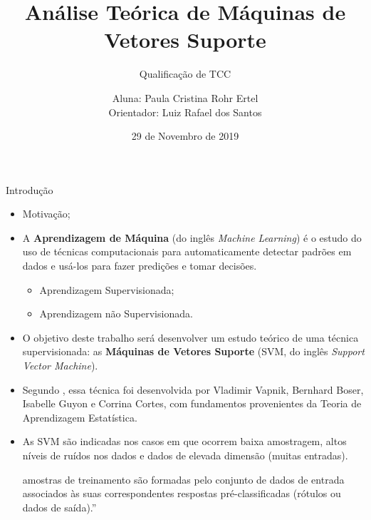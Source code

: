 \documentclass{beamer}
\title[Análise Teórica de SVM]{Análise Teórica de Máquinas de Vetores Suporte}
\subtitle{Qualificação de TCC}
\author[Paula Ertel]{Aluna: Paula Cristina Rohr Ertel \\ Orientador: Luiz Rafael dos Santos}
\institute[UFSC]{Universidade Federal de Santa Catarina - Campus Blumenau}
\date{29 de Novembro de 2019}
\theoremstyle{definition}%
\begin{document}
\begin{frame}
	\maketitle
\end{frame}


\begin{frame}{Introdução}
\begin{itemize}
	\item Motivação;
	\item A \textbf{Aprendizagem de Máquina} (do inglês \textit{Machine Learning}) é o estudo do uso de técnicas computacionais para automaticamente detectar padrões em dados e usá-los para fazer predições e tomar decisões.
	\begin{itemize}
		\item Aprendizagem Supervisionada;
		\item Aprendizagem não Supervisionada.	
	\end{itemize}
\end{itemize}
\end{frame}

\begin{frame}
\begin{itemize}
	\item O objetivo deste trabalho será desenvolver um estudo teórico de uma técnica supervisionada: as \textbf{Máquinas de Vetores Suporte} (SVM, do inglês \textit{Support Vector Machine}).

	\item Segundo \textcite{Evelin2017}, essa técnica foi desenvolvida por Vladimir Vapnik, Bernhard Boser, Isabelle Guyon e Corrina Cortes, com fundamentos provenientes da Teoria de Aprendizagem Estatística.
	
	\item As SVM são indicadas nos casos em que ocorrem baixa amostragem, altos níveis de ruídos nos dados e dados de elevada dimensão (muitas entradas).
	
	
	amostras de treinamento são formadas pelo conjunto de dados de entrada associados 
	às suas correspondentes respostas pré-classificadas (rótulos ou dados de saída).''
\end{itemize}
\end{frame}
\end{document}
